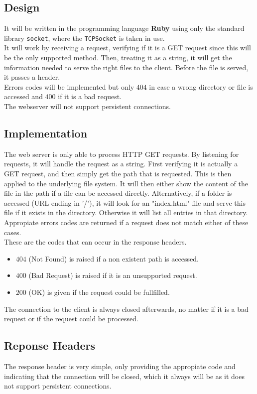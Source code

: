 \documentclass{acm_proc_article-sp}
\begin{document}
\subsection{Design}\label{2}
It will be written in the programming language \textbf{Ruby} using only the standard library \texttt{socket}, where the \texttt{TCPSocket} is taken in use.\\
It will work by receiving a request, verifying if it is a GET request since this will be the only supported method. Then, treating it as a string, it will get the information needed to serve the right files to the client. Before the file is served, it passes a header.\\
Errors codes will be implemented but only $404$ in case a wrong directory or file is accessed and $400$ if it is a bad request.\\
The webserver will not support persistent connections.

\subsection{Implementation}
The web server is only able to process HTTP GET requests. By listening for requests, it  will handle the request as a string. First verifying it is actually a GET request, and then simply get the path that is requested. This is then applied to the underlying file system. It will then either show the content of the file in the path if a file can be accessed directly. Alternatively, if a folder is accessed (URL ending in '/'), it will look for an "index.html" file and serve this file if it exists in the directory. Otherwise it will list all entries in that directory. Appropiate errors codes are returned if a request does not match either of these cases.\\
These are the codes that can occur in the response headers. 
\begin{itemize}
\item $404$ (Not Found) is raised if a non existent path is accessed.
\item $400$ (Bad Request) is raised if it is an unsupported request.
\item $200$ (OK) is given if the request could be fullfilled.
\end{itemize}
The connection to the client is always closed afterwards, no matter if it is a bad request or if the request could be processed.

\subsection{Reponse Headers}
The response header is very simple, only providing the appropiate code and indicating that the connection will be closed, which it always will be as it does not support persistent connections.
\end{document}
